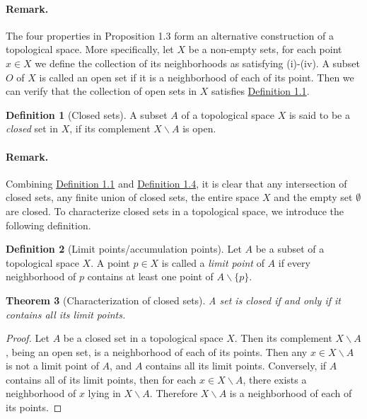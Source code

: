 \documentclass{article}
\numberwithin{equation}{section}
\theoremstyle{plain}
\newtheorem{theorem}{Theorem}[section]
\theoremstyle{definition}
\newtheorem{definition}[theorem]{Definition}
\begin{document}
\paragraph{Remark.} The four properties in Proposition 1.3 form an alternative construction of a topological space. More specifically, let $X$ be a non-empty sets, for each point $x\in X$ we define the collection of its neighborhoods as satisfying (i)-(iv). A subset $O$ of $X$ is called an open set if it is a neighborhood of each of its point. Then we can verify that the collection of open sets in $X$ satisfies \hyperref[def:1.1]{Definition 1.1}.

\begin{definition}[Closed sets]\label{def:1.4}
A subset $A$ of a topological space $X$ is said to be a \textit{closed} set in $X$, if its complement $X\backslash A$ is open.
\end{definition}

\paragraph{Remark.} Combining \hyperref[def:1.1]{Definition 1.1} and \hyperref[def:1.4]{Definition 1.4}, it is clear that any intersection of closed sets, any finite union of closed sets, the entire space $X$ and the empty set $\emptyset$ are closed. To characterize closed sets in a topological space, we introduce the following definition.

\begin{definition}[Limit points/accumulation points]\label{def:1.5} 
Let $A$ be a subset of a topological space $X$. A point $p\in X$ is called a \textit{limit point} of $A$ if every neighborhood of $p$ contains at least one point of $A\backslash\{p\}$.
\end{definition}

\newpage
\begin{theorem}[Characterization of closed sets]\label{thm:1.6}
A set is closed if and only if it contains all its limit points.
\end{theorem}
\begin{proof}
Let $A$ be a closed set in a topological space $X$. Then its complement $X\backslash A$, being an open set, is a neighborhood of each of its points. Then any $x\in X\backslash A$ is not a limit point of $A$, and $A$ contains all its limit points. Conversely, if $A$ contains all of its limit points, then for each $x\in X\backslash A$, there exists a neighborhood of $x$ lying in $X\backslash A$. Therefore $X\backslash A$ is a neighborhood of each of its points.
\end{proof}
\end{document}
